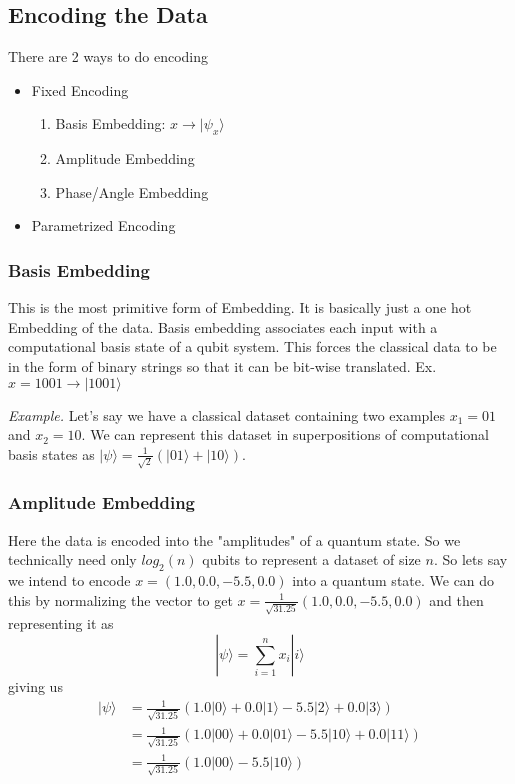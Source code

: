 \documentclass[hidelinks]{book}
\numberwithin{equation}{section}
\begin{document}
\subsection{Encoding the Data}
There are 2 ways to do encoding
\begin{itemize}
  \item Fixed Encoding
    \begin{enumerate}
    \item Basis Embedding: $x \rightarrow |\psi_x\rangle$
    \item Amplitude Embedding
    \item Phase/Angle Embedding
    \end{enumerate}
  \item Parametrized Encoding
\end{itemize}

\subsubsection{Basis Embedding}
This is the most primitive form of Embedding. It is basically just a one hot
Embedding of the data. Basis embedding associates each input with a computational basis state of a qubit system.
This forces the classical data to be in the form of binary strings so that it can be
bit-wise translated. Ex. $x = 1001 \rightarrow |1001\rangle$

\textit{Example.} Let's say we have a classical dataset containing two examples $x_1 = 01 $ and $x_2 = 10$. We can represent this dataset in superpositions of computational basis states as $|\psi\rangle = \frac{1}{\sqrt{2}}(|01\rangle + |10\rangle)$.

\subsubsection{Amplitude Embedding}
Here the data is encoded into the "amplitudes" of a quantum state. So we technically need only $log_2(n)$ qubits to represent a dataset of size $n$. So lets say we intend to encode $x = (1.0, 0.0, -5.5, 0.0)$ into a quantum state. We can do this by normalizing the vector to get $x = \frac{1}{\sqrt{31.25}}(1.0, 0.0, -5.5, 0.0)$ and then representing it as
\begin{equation}
  |\psi\rangle = \sum_{i=1}^n x_i |i\rangle
\end{equation}
giving us
\begin{equation}
\begin{split}
  |\psi\rangle & = \frac{1}{\sqrt{31.25}}(1.0|0\rangle + 0.0|1\rangle - 5.5|2\rangle + 0.0|3\rangle) \\
  & = \frac{1}{\sqrt{31.25}}(1.0|00\rangle + 0.0|01\rangle - 5.5|10\rangle + 0.0|11\rangle) \\
  & = \frac{1}{\sqrt{31.25}}(1.0|00\rangle - 5.5|10\rangle)
\end{split}
\end{equation}
\end{document}
